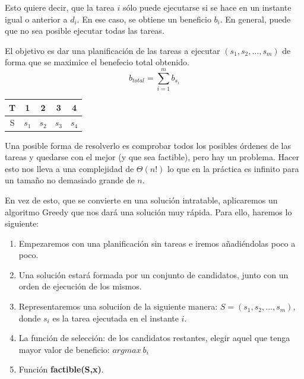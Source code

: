 \documentclass[10pt,a4paper,spanish]{report}
\theoremstyle{definition}
\theoremstyle{remark}
\begin{document}
Esto quiere decir, que la tarea $i$ sólo puede ejecutarse si se hace en un instante igual o anterior a $d_i$. En ese caso, se obtiene un beneficio $b_i$. En general, puede que no sea posible ejecutar todas las tareas.

El objetivo es dar una planificación de las tareas a ejecutar $(s_1,s_2,\ldots,s_m)$ de forma que se maximice el benefecio total obtenido.
\begin{displaymath}
b_{total} = \sum_{i = 1}^m b_{s_{i}}
\end{displaymath}
\begin{center}
    \begin{tabular}{|c|c|c|c|c|}
        \hline
        \rowcolor[rgb]{0.8,0.8,0.8}T & 1 & 2 & 3 & 4 \\
        \hline
        \cellcolor[rgb]{0.8,0.8,0.8}S & $s_1$ & $s_2$ & $s_3$ & $s_4$\\
        \hline
    \end{tabular}
\end{center}

Una posible forma de resolverlo es comprobar todos los posibles órdenes de las tareas y quedarse con el mejor (y que sea factible), pero hay un problema. Hacer esto nos lleva a una complejidad de $\Theta(n!)$ lo que en la práctica es infinito para un tamaño no demasiado grande de $n$.

En vez de esto, que se convierte en una solución intratable, aplicaremos un algoritmo Greedy que nos dará una solución muy rápida. Para ello, haremos lo siguiente:
\begin{enumerate}[---]
    \item Empezaremos con una planificación sin tareas e iremos añadiéndolas poco a poco.
    \item Una solución estará formada por un conjunto de candidatos, junto con un orden de ejecución de los mismos.
    \item Representaremos una soluciíon de la siguiente manera: $S=(s_1,s_2,\ldots, s_m)$, donde $s_i$ es la tarea ejecutada en el instante $i$.
    \item La función de selección: de los candidatos restantes, elegir aquel que tenga mayor valor de beneficio: $argmax~b_i$
    \item Función \textbf{\textcolor{electriccrimson}{factible(S,x)}}.
 \end{enumerate} 
\end{document}
